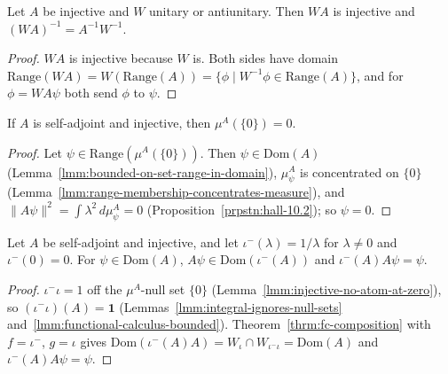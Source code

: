 \begin{lemma}
    \label{lmm:inverse-of-product-with-bijection}
    \leanok
    Let $A$ be injective and $W$ unitary or antiunitary. Then $WA$ is injective and $(WA)^{-1} = A^{-1}W^{-1}$.
\end{lemma}
\begin{proof}
    \leanok
    $WA$ is injective because $W$ is. Both sides have domain $\text{Range}(WA) = W(\text{Range}(A)) = \{ \phi \mid W^{-1}\phi \in \text{Range}(A) \}$, and for $\phi = WA\psi$ both send $\phi$ to $\psi$.
\end{proof}

\begin{lemma}
    \label{lmm:injective-no-atom-at-zero}
    \leanok
    If $A$ is self-adjoint and injective, then $\mu^A(\{0\}) = 0$.
\end{lemma}
\begin{proof}
    \leanok
    Let $\psi \in \text{Range}(\mu^A(\{0\}))$. Then $\psi \in \text{Dom}(A)$ (Lemma~\ref{lmm:bounded-on-set-range-in-domain}), $\mu^A_\psi$ is concentrated on $\{0\}$ (Lemma~\ref{lmm:range-membership-concentrates-measure}), and $\|A\psi\|^2 = \int \lambda^2 \, d\mu^A_\psi = 0$ (Proposition~\ref{prpstn:hall-10.2}); so $\psi = 0$.
\end{proof}

\begin{lemma}
    \label{lmm:inverse-fc-extends}
    \leanok
    Let $A$ be self-adjoint and injective, and let $\iota^{-}(\lambda) = 1/\lambda$ for $\lambda \ne 0$ and $\iota^{-}(0) = 0$. For $\psi \in \text{Dom}(A)$, $A\psi \in \text{Dom}(\iota^{-}(A))$ and $\iota^{-}(A)A\psi = \psi$.
\end{lemma}
\begin{proof}
    \leanok
    $\iota^{-}\iota = 1$ off the $\mu^A$-null set $\{0\}$ (Lemma~\ref{lmm:injective-no-atom-at-zero}), so $(\iota^{-}\iota)(A) = \mathbf{1}$ (Lemmas~\ref{lmm:integral-ignores-null-sets} and~\ref{lmm:functional-calculus-bounded}). Theorem~\ref{thrm:fc-composition} with $f = \iota^{-}$, $g = \iota$ gives $\text{Dom}(\iota^{-}(A)A) = W_\iota \cap W_{\iota^-\iota} = \text{Dom}(A)$ and $\iota^{-}(A)A\psi = \psi$.
\end{proof}

